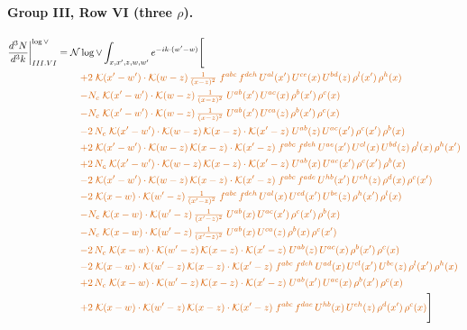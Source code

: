 \documentclass[10pt]{article}
\numberwithin{equation}{section}
\newcommand{\NNv}{\mathcal N\log\vee}
\begin{document}
\paragraph{Group III, Row VI (three $\rho$).}
\begin{align}
\frac{d^3N}{d^3k}\bigg|^{\log\vee}_{III.VI}={}&\NNv\int_{x,x',z,w,w'}e^{-ik\cdot(w'-w)}\Bigg[\notag\\
&\quad{\color{BFK}+2\;\mathcal{K}(x'-w')\cdot\mathcal{K}(w-z)\,\tfrac{1}{(x-z)^{2}}\;f^{abc}\,f^{deh}\,U^{al}(x')\,U^{ce}(x)\,U^{bd}(z)\,\rho^{l}(x')\,\rho^{h}(x)}\notag\\
&\quad{\color{BFK}-N_c\;\mathcal{K}(x'-w')\cdot\mathcal{K}(w-z)\,\tfrac{1}{(x-z)^{2}}\;U^{ab}(x')\,U^{ac}(x)\,\rho^{b}(x')\,\rho^{c}(x)}\notag\\
&\quad{\color{BFK}-N_c\;\mathcal{K}(x'-w')\cdot\mathcal{K}(w-z)\,\tfrac{1}{(x-z)^{2}}\;U^{ab}(x')\,U^{ca}(z)\,\rho^{b}(x')\,\rho^{c}(x)}\notag\\
&\quad{\color{BFK}-2\,N_c\;\mathcal{K}(x'-w')\cdot\mathcal{K}(w-z)\,\mathcal{K}(x-z)\cdot\mathcal{K}(x'-z)\;U^{ab}(z)\,U^{ac}(x')\,\rho^{c}(x')\,\rho^{b}(x)}\notag\\
&\quad{\color{BFK}+2\;\mathcal{K}(x'-w')\cdot\mathcal{K}(w-z)\,\mathcal{K}(x-z)\cdot\mathcal{K}(x'-z)\;f^{abc}\,f^{deh}\,U^{ae}(x')\,U^{cl}(x)\,U^{bd}(z)\,\rho^{l}(x)\,\rho^{h}(x')}\notag\\
&\quad{\color{BFK}+2\,N_c\;\mathcal{K}(x'-w')\cdot\mathcal{K}(w-z)\,\mathcal{K}(x-z)\cdot\mathcal{K}(x'-z)\;U^{ab}(x)\,U^{ac}(x')\,\rho^{c}(x')\,\rho^{b}(x)}\notag\\
&\quad{\color{BFK}-2\;\mathcal{K}(x'-w')\cdot\mathcal{K}(w-z)\,\mathcal{K}(x-z)\cdot\mathcal{K}(x'-z)\;f^{abc}\,f^{ade}\,U^{hb}(x')\,U^{eh}(z)\,\rho^{d}(x)\,\rho^{c}(x')}\notag\\
&\quad{\color{BFK}-2\;\mathcal{K}(x-w)\cdot\mathcal{K}(w'-z)\,\tfrac{1}{(x'-z)^{2}}\;f^{abc}\,f^{deh}\,U^{al}(x)\,U^{cd}(x')\,U^{be}(z)\,\rho^{h}(x')\,\rho^{l}(x)}\notag\\
&\quad{\color{BFK}-N_c\;\mathcal{K}(x-w)\cdot\mathcal{K}(w'-z)\,\tfrac{1}{(x'-z)^{2}}\;U^{ab}(x)\,U^{ac}(x')\,\rho^{c}(x')\,\rho^{b}(x)}\notag\\
&\quad{\color{BFK}-N_c\;\mathcal{K}(x-w)\cdot\mathcal{K}(w'-z)\,\tfrac{1}{(x'-z)^{2}}\;U^{ab}(x)\,U^{ca}(z)\,\rho^{b}(x)\,\rho^{c}(x')}\notag\\
&\quad{\color{BFK}-2\,N_c\;\mathcal{K}(x-w)\cdot\mathcal{K}(w'-z)\,\mathcal{K}(x-z)\cdot\mathcal{K}(x'-z)\;U^{ab}(z)\,U^{ac}(x)\,\rho^{b}(x')\,\rho^{c}(x)}\notag\\
&\quad{\color{BFK}-2\;\mathcal{K}(x-w)\cdot\mathcal{K}(w'-z)\,\mathcal{K}(x-z)\cdot\mathcal{K}(x'-z)\;f^{abc}\,f^{deh}\,U^{ad}(x)\,U^{cl}(x')\,U^{be}(z)\,\rho^{l}(x')\,\rho^{h}(x)}\notag\\
&\quad{\color{BFK}+2\,N_c\;\mathcal{K}(x-w)\cdot\mathcal{K}(w'-z)\,\mathcal{K}(x-z)\cdot\mathcal{K}(x'-z)\;U^{ab}(x')\,U^{ac}(x)\,\rho^{b}(x')\,\rho^{c}(x)}\notag\\
&\quad{\color{BFK}+2\;\mathcal{K}(x-w)\cdot\mathcal{K}(w'-z)\,\mathcal{K}(x-z)\cdot\mathcal{K}(x'-z)\;f^{abc}\,f^{dae}\,U^{hb}(x)\,U^{eh}(z)\,\rho^{d}(x')\,\rho^{c}(x)}\Bigg]\label{eq:P8}
\end{align}
\end{document}

